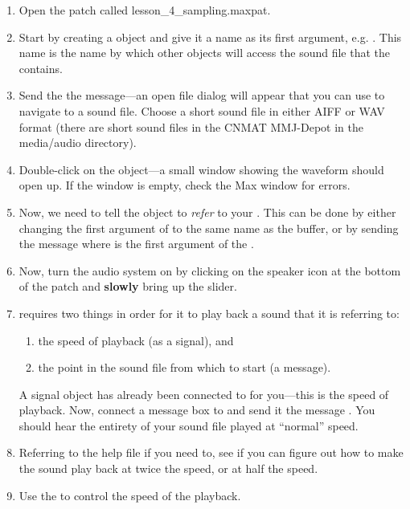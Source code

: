 \begin{enumerate}

\item Open the patch called lesson\_4\_sampling.maxpat.

\item Start by creating a  object and give it a name as its first argument, e.g.
.  This name is the name by which other objects will access the sound file
that the  contains.

\item Send the  the  message---an open file dialog will appear
that you can use to navigate to a sound file.  Choose a short sound file in either AIFF or WAV
format (there are short sound files in the CNMAT MMJ-Depot in the media/audio directory).

\item Double-click on the  object---a small window showing the waveform should open up.
If the window is empty, check the Max window for errors.

\item\label{groove-refer} Now, we need to tell the  object to {\em refer} to your .  
This can be done by either changing the first argument of  to the same name as the 
buffer, or by sending  the message where 
is the first argument of the .

\item Now, turn the audio system on by clicking on the speaker icon at the bottom of the patch
and \textbf{slowly} bring up the  slider.

\item {} requires two things in order for it to play back a sound that it is referring to:
\begin{enumerate}
\item the speed of playback (as a signal), and
\item the point in the sound file from which to start (a message).
\end{enumerate}
A signal object  has already been connected to  for you---this 
is the speed of playback.  Now, connect a message box to  and send it the message
.  You should hear the entirety of your sound file played at ``normal'' speed.

\item Referring to the  help file if you need to, see if you can figure out how to make the sound
play back at twice the speed, or at half the speed.  

\item Use the \gt{} to control the speed of the playback.

\end{enumerate}














